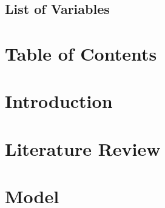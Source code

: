 \documentclass[
	12pt, 
	]{article}
\numberwithin{equation}{section}
\theoremstyle{definition}
\theoremstyle{plain}
\theoremstyle{plain}
\theoremstyle{plain}
\begin{document}

\subsection*{List of Variables} %

\thispagestyle{empty}

\newpage


\section*{Table of Contents}

{
	\setlength{\parskip}{1pt}
	\singlespacing
	\tableofcontents
}

\thispagestyle{empty}

\newpage


\section{Introduction}\label{sec:introduction}





\section{Literature Review}\label{sec:literature-review}



\newpage


\section{Model}\label{sec:model}



\end{document}
